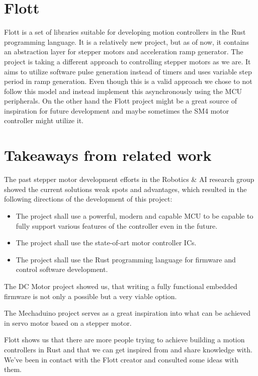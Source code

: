 \section{Flott}
\label{sec:flott}
Flott is a set of libraries suitable for developing motion controllers in the Rust programming language\cite{braun_flott_nodate}.
It is a relatively new project, but as of now, it contains an abstraction layer for stepper motors and acceleration ramp generator.
The project is taking a different approach to controlling stepper motors as we are.
It aims to utilize software pulse generation instead of timers and uses variable step period in ramp generation.
Even though this is a valid approach we chose to not follow this model and instead implement this asynchronously using the MCU peripherals.
On the other hand the Flott project might be a great source of inspiration for future development and maybe sometimes the SM4 motor controller might utilize it.

\section{Takeaways from related work}
\label{sec:related-work-takeaways}
The past stepper motor development efforts in the Robotics \& AI research group showed the current solutions weak spots and advantages, which resulted in the following directions of the development of this project:
\begin{itemize}
    \item The project shall use a powerful, modern and capable MCU to be capable to fully support various features of the controller even in the future.
    \item The project shall use the state-of-art motor controller ICs.
    \item The project shall use the Rust programming language for firmware and control software development.
\end{itemize}

The DC Motor project showed us, that writing a fully functional embedded firmware is not only a possible but a very viable option.

The Mechaduino project serves as a great inspiration into what can be achieved in servo motor based on a stepper motor.

Flott shows us that there are more people trying to achieve building a motion controllers in Rust and that we can get inspired from and share knowledge with.
We've been in contact with the Flott creator and consulted some ideas with them.

